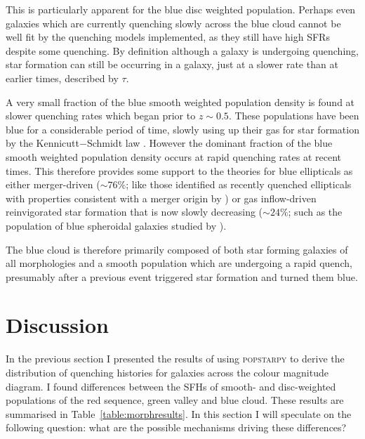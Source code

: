 This is particularly apparent for the blue disc weighted population. Perhaps even galaxies which are currently quenching slowly across the blue cloud cannot be well fit by the quenching models implemented, as they still have high SFRs despite some quenching. By definition although a galaxy is undergoing quenching, star formation can still be occurring in a galaxy, just at a slower rate than at earlier times, described by $\tau$.

A very small fraction of the blue smooth weighted population density is found at slower quenching rates which began prior to $z \sim 0.5 $. These populations have been blue for a considerable period of time, slowly using up their gas for star formation by the Kennicutt$-$Schmidt law \citep{Schmidt59, Kennicutt97}. However the dominant fraction of the blue smooth weighted population density occurs at rapid quenching rates at recent times. This therefore provides some support to the theories for blue ellipticals as either merger-driven ($\sim76\%$; like those identified as recently quenched ellipticals with properties consistent with a merger origin by \citealt{McIntosh14}) or gas inflow-driven reinvigorated star formation that is now slowly decreasing ($\sim24\%$; such as the population of blue spheroidal galaxies studied by \citealt{Kaviraj13}).

The blue cloud is therefore primarily composed of both star forming galaxies of all morphologies and a smooth population which are undergoing a rapid quench, presumably after a previous event triggered star formation and turned them blue.


\section{Discussion}\label{morph:discussion}

In the previous section I presented the results of using \textsc{popstarpy} to derive the distribution of quenching histories for galaxies across the colour magnitude diagram. I  found differences between the SFHs of smooth- and disc-weighted populations of the red sequence, green valley and blue cloud. These results are summarised in Table~\ref{table:morphresults}. In this section I will speculate on the following question: what are the possible mechanisms driving these differences? 

